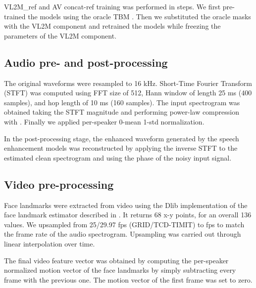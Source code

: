 \documentclass{article}
\begin{document}
VL2M\_ref and AV concat-ref training was performed in  steps. We first pre-trained the models using the oracle TBM . Then we substituted the oracle masks with the VL2M component and retrained the models while freezing the parameters of the VL2M component.

\subsection{Audio pre- and post-processing}
The original waveforms were resampled to 16 kHz. Short-Time Fourier Transform (STFT)  was computed using FFT size of 512, Hann window of length 25 ms (400 samples), and hop length of 10 ms (160 samples). The input spectrogram was obtained taking the STFT magnitude and performing power-law compression  with . Finally we applied per-speaker 0-mean 1-std normalization.

In the post-processing stage, the enhanced waveform generated by the speech enhancement models was reconstructed by applying the inverse STFT to the estimated clean spectrogram and using the phase of the noisy input signal.

\subsection{Video pre-processing}
Face landmarks were extracted from video using the Dlib \cite{dlib09} implementation of the face landmark estimator described in \cite{Kazemi_2014_CVPR}. It returns 68 x-y points, for an overall 136 values.
We upsampled from 25/29.97 fps (GRID/TCD-TIMIT) to  fps to match the frame rate of the audio spectrogram. Upsampling was carried out through linear interpolation over time. 

The final video feature vector  was obtained by computing the per-speaker normalized motion vector of the face landmarks by simply subtracting every frame with the previous one. The motion vector of the first frame was set to zero.
\end{document}
